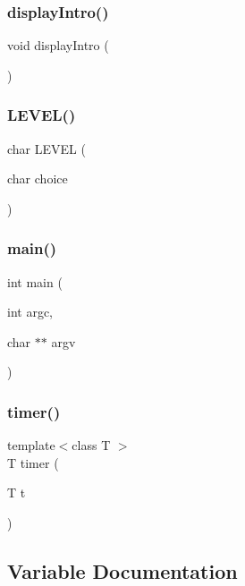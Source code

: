 \mbox{\label{main_8cpp_abdd6a4d14501287a577ea668c521ef6b}} 
\subsubsection{displayIntro()}
{\footnotesize\ttfamily void display\+Intro (\begin{DoxyParamCaption}{ }\end{DoxyParamCaption})}

\mbox{\label{main_8cpp_a10a224514ae7e67289c6017d552e76dd}} 
\subsubsection{LEVEL()}
{\footnotesize\ttfamily char L\+E\+V\+EL (\begin{DoxyParamCaption}\item[{char}]{choice }\end{DoxyParamCaption})}

\mbox{\label{main_8cpp_a3c04138a5bfe5d72780bb7e82a18e627}} 
\subsubsection{main()}
{\footnotesize\ttfamily int main (\begin{DoxyParamCaption}\item[{int}]{argc,  }\item[{char $\ast$$\ast$}]{argv }\end{DoxyParamCaption})}

\mbox{\label{main_8cpp_a810e500c5d3f6aa07f33665e7345afa5}} 
\subsubsection{timer()}
{\footnotesize\ttfamily template$<$class T $>$ \\
T timer (\begin{DoxyParamCaption}\item[{T}]{t }\end{DoxyParamCaption})}



\subsection{Variable Documentation}
\mbox{\label{main_8cpp_a65987dc37610c19becbfe43f0bcbf7fa}} 
